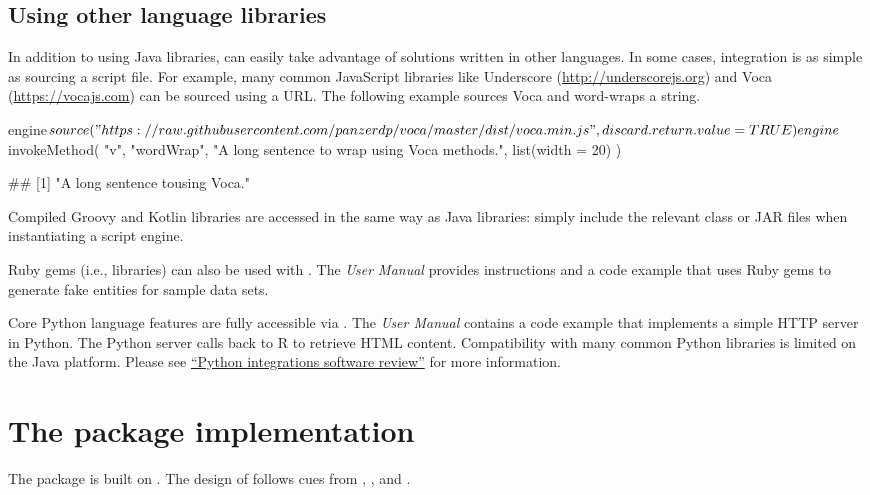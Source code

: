 \subsection{Using other language libraries} %

In addition to using Java libraries,  can easily take advantage of solutions written in other languages. In some cases, integration is as simple as sourcing a script file. For example, many common JavaScript libraries like Underscore (\url{http://underscorejs.org}) and Voca (\url{https://vocajs.com}) can be sourced using a URL. The following example sources Voca and word-wraps a string.

\begin{example}
engine$source(
  "https://raw.githubusercontent.com/panzerdp/voca/master/dist/voca.min.js",
  discard.return.value = TRUE
)
engine$invokeMethod(
  "v",
  "wordWrap",
  "A long sentence to wrap using Voca methods.",
  list(width = 20)
)

## [1] "A long sentence to\nwrap using Voca\nmethods."
\end{example}

Compiled Groovy and Kotlin libraries are accessed in the same way as Java libraries: simply include the relevant class or JAR files when instantiating a script engine.

Ruby gems (i.e., libraries) can also be used with . The \textit{ User Manual} provides instructions and a code example that uses Ruby gems to generate fake entities for sample data sets.

Core Python language features are fully accessible via . The \textit{ User Manual} contains a code example that implements a simple HTTP server in Python. The Python server calls back to R to retrieve HTML content. Compatibility with many common Python libraries is limited on the Java platform. Please see \hyperlink{python-integrations}{``Python integrations software review''} for more information.

\hypertarget{the-jsr223-package-implementation}{}
\section{The  package implementation}

The  package is built on . The design of  follows cues from ,  \citep{rscala}, and  \citep{v8pkg}.

